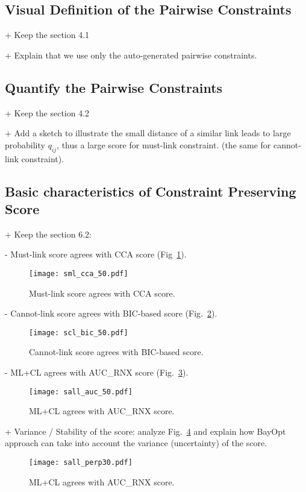 \subsection{Visual Definition of the Pairwise Constraints}
+ Keep the section 4.1

+ Explain that  we use only the auto-generated pairwise constraints.

\subsection{Quantify the Pairwise Constraints}
+ Keep the section 4.2

+ Add a sketch to illustrate the small distance of a similar link leads to large probability $q_{ij}$, thus a large score for must-link constraint. (the same for cannot-link constraint).

\subsection{Basic characteristics of Constraint Preserving Score}

+ Keep the section 6.2:

\hspace{10pt }- Must-link score agrees with CCA score (Fig~\ref{fig:sml}).
\begin{figure}
\centering
\texttt{[image: sml\_cca\_50.pdf]}
\caption{Must-link score agrees with CCA score.}\label{fig:sml}
\end{figure}

\hspace{10pt }- Cannot-link score agrees with BIC-based score (Fig.~\ref{fig:scl}).
\begin{figure}
\centering
\texttt{[image: scl\_bic\_50.pdf]}
\caption{Cannot-link score agrees with BIC-based score.}\label{fig:scl}
\end{figure}

\hspace{10pt }- ML+CL agrees with AUC\_RNX score (Fig.~\ref{fig:sall}).
\begin{figure}
\centering
\texttt{[image: sall\_auc\_50.pdf]}
\caption{ML+CL agrees with AUC\_RNX score.}\label{fig:sall}
\end{figure}

\vspace{8pt} \par
+ Variance / Stability of the score: analyze Fig.~\ref{fig:svar} and explain how BayOpt approach can take into account the variance (uncertainty) of the score.
\begin{figure}
\centering
\texttt{[image: sall\_perp30.pdf]}
\caption{ML+CL agrees with AUC\_RNX score.}\label{fig:svar}
\end{figure}


